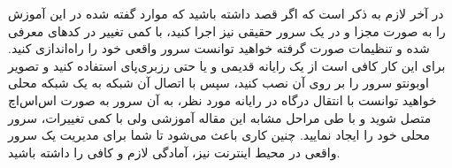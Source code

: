 در آخر لازم به ذکر است که اگر قصد داشته باشید که موارد گفته شده در این آموزش را به صورت مجزا  و در یک سرور حقیقی نیز اجرا کنید، با کمی تغییر در کدهای معرفی شده و تنظیمات صورت گرفته خواهید توانست سرور واقعی خود را راه‌اندازی کنید. برای این کار کافی است از یک رایانه قدیمی و یا حتی رزبری‌پای استفاده کنید و تصویر اوبونتو سرور را بر روی آن نصب کنید، سپس با اتصال آن شبکه به یک شبکه محلی خواهید توانست با انتقال درگاه در رایانه مورد نظر، به آن سرور به صورت اس‌اس‌اچ متصل شوید و با طی مراحل مشابه این مقاله آموزشی ولی با کمی تغییرات، سرور محلی خود را ایجاد نمایید. چنین کاری باعث می‌شود تا شما برای مدیریت یک سرور واقعی در محیط اینترنت نیز، آمادگی لازم و کافی را داشته باشید.